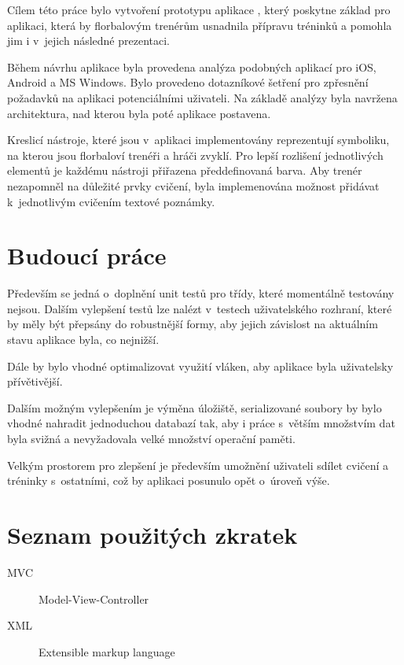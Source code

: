 \documentclass[thesis=B,czech]{FITthesis}[2012/06/26]
\begin{document}
\begin{conclusion}
	Cílem této práce bylo vytvoření prototypu aplikace , který poskytne základ pro aplikaci, která by florbalovým trenérům usnadnila přípravu tréninků a pomohla jim i v~jejich následné prezentaci.

	Během návrhu aplikace byla provedena analýza podobných aplikací pro iOS, Android a MS Windows. Bylo provedeno dotazníkové šetření pro zpřesnění požadavků na aplikaci potenciálními uživateli. Na základě analýzy byla navržena architektura, nad kterou byla poté aplikace postavena.

	Kreslicí nástroje, které jsou v~aplikaci implementovány reprezentují symboliku, na kterou jsou florbaloví trenéři a hráči zvyklí. Pro lepší rozlišení jednotlivých elementů je každému nástroji přiřazena předdefinovaná barva. Aby trenér nezapomněl na důležité prvky cvičení, byla implemenována možnost přidávat k~jednotlivým cvičením textové poznámky.

\end{conclusion}

\chapter{Budoucí práce}

	Především se jedná o~doplnění unit testů pro třídy, které momentálně testovány nejsou. Dalším vylepšení testů lze nalézt v~testech uživatelského rozhraní, které by měly být přepsány do robustnější formy, aby jejich závislost na aktuálním stavu aplikace byla, co nejnižší.

	Dále by bylo vhodné optimalizovat využití vláken, aby aplikace byla uživatelsky přívětivější.

	Dalším možným vylepšením je výměna úložiště, serializované soubory by bylo vhodné nahradit jednoduchou databazí tak, aby i práce s~větším množstvím dat byla svižná a nevyžadovala velké množství operační paměti.

	Velkým prostorem pro zlepšení je především umožnění uživateli sdílet cvičení a tréninky s~ostatními, což by aplikaci posunulo opět o~úroveň výše.




\appendix

\chapter{Seznam použitých zkratek}
\begin{description}
	\item[MVC] Model-View-Controller
	\item[XML] Extensible markup language
\end{description}
\end{document}
